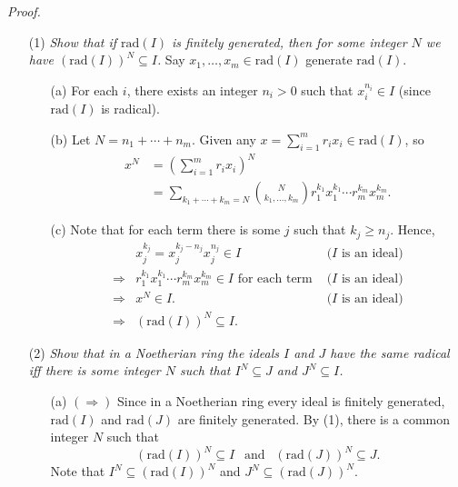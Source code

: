 \documentclass{article}
\begin{document}
\emph{Proof.}
\begin{enumerate}
  \item[(1)]
  \emph{Show that if $\mathrm{rad}(I)$ is finitely generated,
  then for some integer $N$ we have $(\mathrm{rad}(I))^N \subseteq I$.}
  Say $x_1, \ldots, x_m \in \mathrm{rad}(I)$ generate $\mathrm{rad}(I)$.
  \begin{enumerate}
    \item[(a)]
    For each $i$, there exists an integer $n_i > 0$ such that $x_i^{n_i} \in I$
    (since $\mathrm{rad}(I)$ is radical).
    \item[(b)]
    Let $N = n_1 + \cdots + n_m$.
    Given any $x = \sum_{i=1}^{m} r_i x_i \in \mathrm{rad}(I)$,
    so
    \begin{align*}
      x^N
      &= \left( \sum_{i=1}^{m} r_i x_i \right)^{N} \\
      &= \sum_{k_1 + \cdots + k_m = N} {N \choose k_1,\ldots,k_m}
        r_1^{k_1} x_1^{k_1} \cdots r_m^{k_m} x_m^{k_m}.
    \end{align*}
    \item[(c)]
    Note that for each term there is some $j$ such that $k_j \geq n_j$.
    Hence,
    \begin{align*}
      &x_j^{k_j} = x_j^{k_j-n_j} x_j^{n_j} \in I
        &\text{($I$ is an ideal)} \\
      \Longrightarrow&
      r_1^{k_1} x_1^{k_1} \cdots r_m^{k_m} x_m^{k_m} \in I \text{ for each term }
        &\text{($I$ is an ideal)} \\
      \Longrightarrow&
      x^N \in I.
        &\text{($I$ is an ideal)} \\
      \Longrightarrow&
        (\mathrm{rad}(I))^N \subseteq I.
    \end{align*}
  \end{enumerate}
  \item[(2)]
  \emph{Show that in a Noetherian ring the ideals $I$ and $J$ have the same radical
  iff there is some integer $N$ such that $I^N \subseteq J$ and $J^N \subseteq I$.}
  \begin{enumerate}
    \item[(a)]
    $(\Longrightarrow)$
    Since in a Noetherian ring every ideal is finitely generated,
    $\mathrm{rad}(I)$ and $\mathrm{rad}(J)$ are finitely generated.
    By (1), there is a common integer $N$ such that
    \[
      (\mathrm{rad}(I))^N \subseteq I \:\: \text{ and } \:\:
      (\mathrm{rad}(J))^N \subseteq J.
    \]
    Note that $I^N \subseteq (\mathrm{rad}(I))^N$ and $J^N \subseteq (\mathrm{rad}(J))^N$.

\end{enumerate}
\end{enumerate}
\end{document}
